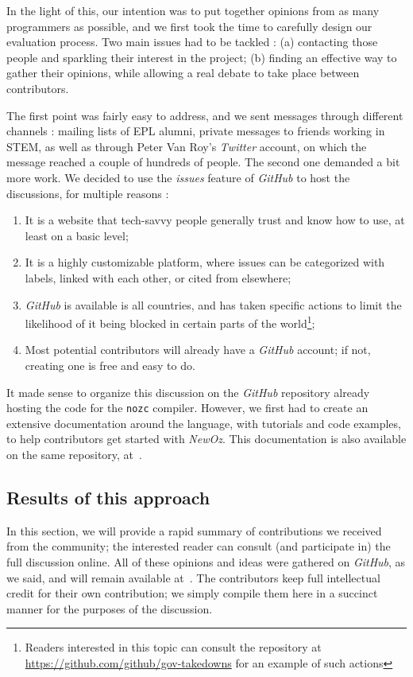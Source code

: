 In the light of this, our intention was to put together opinions from as many programmers as possible, and we first took the time to carefully design our evaluation process.
Two main issues had to be tackled : (a) contacting those people and sparkling their interest in the project; (b) finding an effective way to gather their opinions, while allowing a real debate to take place between contributors.\newline

The first point was fairly easy to address, and we sent messages through different channels : mailing lists of EPL alumni, private messages to friends working in STEM, as well as through Peter Van Roy's \textit{Twitter} account, on which the message reached a couple of hundreds of people.\newline
The second one demanded a bit more work.
We decided to use the \textit{issues} feature of \textit{GitHub} to host the discussions, for multiple reasons :
\begin{enumerate}
    \item It is a website that tech-savvy people generally trust and know how to use, at least on a basic level;
    \item It is a highly customizable platform, where issues can be categorized with labels, linked with each other, or cited from elsewhere;
    \item \textit{GitHub} is available is all countries, and has taken specific actions to limit the likelihood of it being blocked in certain parts of the world\footnote{Readers interested in this topic can consult the repository at \url{https://github.com/github/gov-takedowns} for an example of such actions};
    \item Most potential contributors will already have a \textit{GitHub} account;
    if not, creating one is free and easy to do.
\end{enumerate}
It made sense to organize this discussion on the \textit{GitHub} repository already hosting the code for the \texttt{nozc} compiler.
However, we first had to create an extensive documentation around the language, with tutorials and code examples, to help contributors get started with \textit{NewOz}.
This documentation is also available on the same repository, at~\cite{NozcGitHub}.

\subsection{Results of this approach}\label{subsec:ch4-results}
In this section, we will provide a rapid summary of contributions we received from the community;
the interested reader can consult (and participate in) the full discussion online.
All of these opinions and ideas were gathered on \textit{GitHub}, as we said, and will remain available at~\cite{NozcGitHub}.
The contributors keep full intellectual credit for their own contribution;
we simply compile them here in a succinct manner for the purposes of the discussion.\newline

